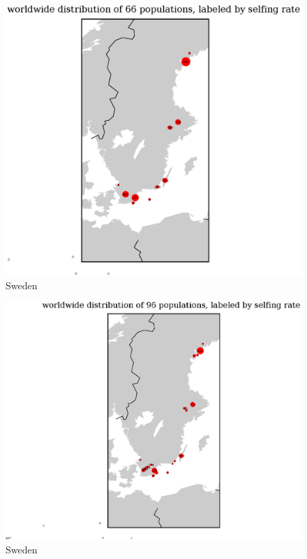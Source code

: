 \documentclass[a4paper,10pt]{article}
\begin{document}
\begin{figure}
\includegraphics[width=1\textwidth]{figures/s0829popid2ecotypeid_25_Swe_10_52_20_65_l3y1_pop_map.eps}
\caption{Sweden}\label{f21}
\end{figure}

\begin{figure}
\includegraphics[width=1\textwidth]{figures/s0829popid2ecotypeid_10_Swe_10_52_20_65_l3y1_pop_map.eps}
\caption{Sweden}\label{f20}
\end{figure}
\end{document}

